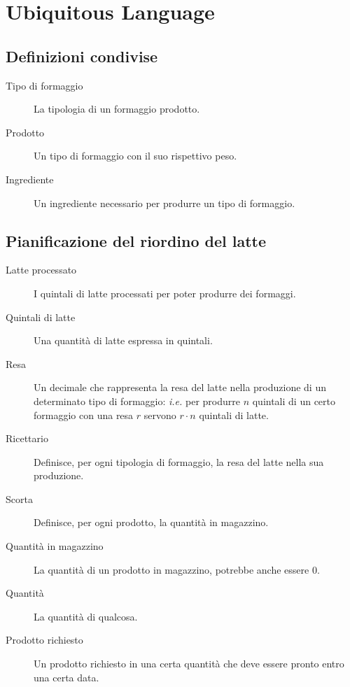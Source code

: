 \chapter{Ubiquitous Language}
\label{app:ubiquitous-language}

\section{Definizioni condivise}
\begin{description}
    \item[Tipo di formaggio] La tipologia di un formaggio prodotto.
    \item[Prodotto] Un tipo di formaggio con il suo rispettivo peso.
    \item[Ingrediente] Un ingrediente necessario per produrre un tipo di formaggio.
\end{description}

\section{Pianificazione del riordino del latte}
\begin{description}
    \item [Latte processato] I quintali di latte processati per poter produrre dei formaggi.
    \item [Quintali di latte] Una quantità di latte espressa in quintali.
    \item [Resa] Un decimale che rappresenta la resa del latte nella produzione di un determinato tipo di formaggio: \textit{i.e.} per produrre $n$ quintali di un certo formaggio con una resa $r$ servono $r \cdot n$ quintali di latte.
    \item [Ricettario] Definisce, per ogni tipologia di formaggio, la resa del latte nella sua produzione.
    \item [Scorta] Definisce, per ogni prodotto, la quantità in magazzino.
    \item [Quantità in magazzino] La quantità di un prodotto in magazzino, potrebbe anche essere 0.
    \item [Quantità] La quantità di qualcosa.
    \item [Prodotto richiesto] Un prodotto richiesto in una certa quantità che deve essere pronto entro una certa data.
\end{description}


